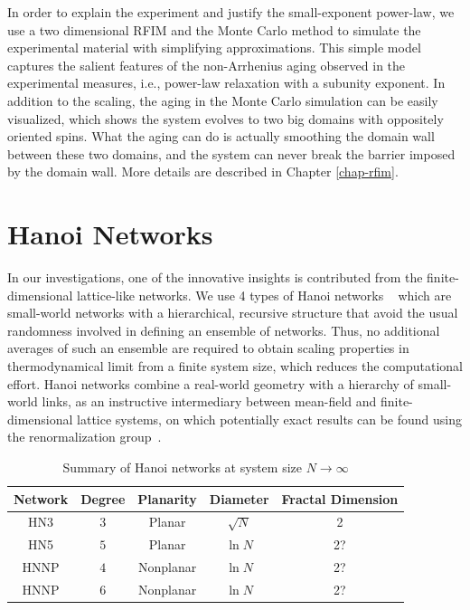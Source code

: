 In order to explain the experiment and justify the small-exponent power-law, we use a two dimensional RFIM and the Monte Carlo method to simulate the experimental material with simplifying approximations. This simple model captures the salient features of the non-Arrhenius aging observed in the experimental measures, i.e., power-law relaxation with a subunity exponent. In addition to the scaling, the aging in the Monte Carlo simulation can be easily visualized, which shows the system evolves to two big domains with oppositely oriented spins. What the aging can do is actually smoothing the domain wall between these two domains, and the system can never break the barrier imposed by the domain wall. More details are described in Chapter \ref{chap-rfim}.

\section{Hanoi Networks}
\label{sec:HN} 
In our investigations, one of the innovative insights is contributed from the finite-dimensional lattice-like networks. We use 4 types of Hanoi networks ~\cite{Boettcher2008HN} which are small-world networks with a hierarchical, recursive structure that avoid the usual randomness involved in defining
an ensemble of networks. Thus, no additional averages of such an ensemble
are required to obtain scaling properties in thermodynamical limit
from a finite system size, which reduces the computational effort.
Hanoi networks combine a real-world geometry with a hierarchy of small-world
links, as an instructive intermediary between mean-field and finite-dimensional
lattice systems, on which potentially exact results can be found using
the renormalization group~\cite{BoHa11}. 

\begin{table}
\begin{centering}
\protect\caption{\label{tab:hns} 
Summary of Hanoi networks at system size $N\rightarrow\infty$ }
\par\end{centering}
\begin{centering}
\par\end{centering}
\centering{}%
\begin{tabular}{|c|c|c|c|c|}
\hline 
Network & Degree  & Planarity & Diameter & Fractal Dimension  \tabularnewline
\hline 
\hline 
HN3  & $3$ & Planar & $\sqrt{N}$ & 2 \tabularnewline
\hline 
HN5  & $5$ & Planar &  $\ln N$ &  2?  \tabularnewline
\hline 
HNNP  & $4$  & Nonplanar &  $\ln N$ & 2?   \tabularnewline
\hline 
HNNP  & $6$  & Nonplanar &  $\ln N$  & 2?  \tabularnewline
\hline 
\end{tabular}
\end{table}

